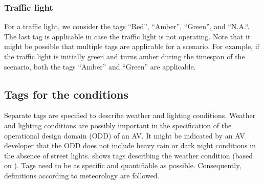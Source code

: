 %

\subsubsection{Traffic light}
\label{sec:traffic light}

For a traffic light, we consider the tags ``Red'', ``Amber'', ``Green'', and ``N.A.``. The last tag is applicable in case the traffic light is not operating.
Note that it might be possible that multiple tags are applicable for a scenario. For example, if the traffic light is initially green and turns amber during the timespan of the scenario, both the tags ``Amber'' and ``Green'' are applicable.




\subsection{Tags for the conditions}
\label{sec:conditions}

Separate tags are specified to describe weather and lighting conditions. Weather and lighting conditions are possibly important in the specification of the operational design domain (ODD) of an AV. It might be indicated by an AV developer that the ODD does not include heavy rain or dark night conditions in the absence of street lights.  shows tags describing the weather condition (based on \cite{mahmassani2012use}). Tags need to be as specific and quantifiable as possible. Consequently, definitions according to meteorology are followed. 

